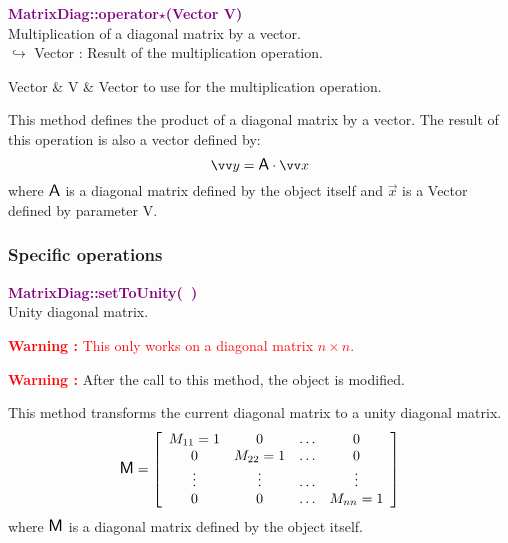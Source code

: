 \textcolor{purple}{\textbf{MatrixDiag::operator$\star$(Vector V)}}\label{MatrixDiag::operator*(Vector V)}\\
Multiplication of a diagonal matrix by a vector.\\ \hspace*{10mm}$\hookrightarrow$ Vector : Result of the multiplication operation.

\begin{tcolorbox}[width=\textwidth,myArgs,tabularx={ll|R}]
Vector & V & Vector to use for the multiplication operation.
\end{tcolorbox}

This method defines the product of a diagonal matrix by a vector.
The result of this operation is also a vector defined by:
\begin{equation*}
\overrightarrow{y} = \A \cdot \overrightarrow{x}
\end{equation*}
where $\mbox{\large\ensuremath{\mathsf{A}}}$ is a diagonal matrix defined by the object itself and $\overrightarrow{x}$ is a Vector defined by parameter V.

\subsubsection{Specific operations}

\textcolor{purple}{\textbf{MatrixDiag::setToUnity(~)}}\label{MatrixDiag::setToUnity()}\\
Unity diagonal matrix.

\hspace*{10mm}\textcolor{red}{\textbf{Warning :} This only works on a diagonal matrix $n \times n$.}

\hspace*{10mm}\textcolor{red}{\textbf{Warning :}} After the call to this method, the object is modified.

This method transforms the current diagonal matrix to a unity diagonal matrix.
\begin{equation*}
\mbox{\large\ensuremath{\mathsf{M}}}=\left[\begin{array}{cccc}
  M_{11}=1 & 0 & \hdots & 0\\
  0 & M_{22}=1 & \hdots & 0\\
  \vdots & \vdots & \hdots & \vdots\\
  0 & 0 & \hdots & M_{nn}=1
  \end{array}\right]
\end{equation*}
where $\mbox{\large\ensuremath{\mathsf{M}}}$ is a diagonal matrix defined by the object itself.

